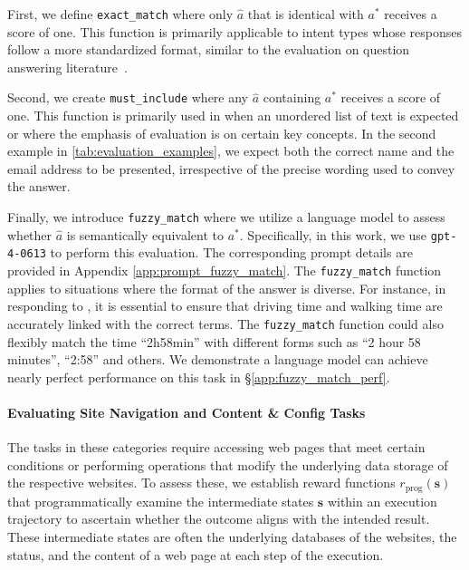 \documentclass{article}
\begin{document}
First, we define \texttt{exact\_match} where only $\hat{a}$ that is identical with $a^*$ receives a score of one. This function is primarily applicable to intent types whose responses follow a more standardized format, similar to the evaluation on question answering literature~\citep{rajpurkar2016squad,yang2018hotpotqa}. 

Second, we create \texttt{must\_include} where any $\hat{a}$ containing $a^*$ receives a score of one. This function is primarily used in %
when %
an unordered list of text is expected or where the emphasis of evaluation is on certain key concepts. In the second example in \autoref{tab:evaluation_examples}, we expect both the correct name and the email address to be presented, irrespective of the precise wording used to convey the answer.

Finally, we introduce \texttt{fuzzy\_match} where we utilize a language model to assess whether $\hat{a}$ is semantically equivalent to $a^*$. 
Specifically, in this work, we use \texttt{gpt-4-0613} to perform this evaluation.
The corresponding prompt details are provided in Appendix \ref{app:prompt_fuzzy_match}. 
The \texttt{fuzzy\_match} function applies to situations where the format of the answer is diverse. For instance, in responding to , it is essential to ensure that driving time and walking time are accurately linked with the correct terms. 
The \texttt{fuzzy\_match} function could also flexibly match the time ``2h58min'' with different forms such as ``2 hour 58 minutes'', ``2:58'' and others. 
We demonstrate a language model can achieve nearly perfect performance on this task in \S\ref{app:fuzzy_match_perf}.



\paragraph{Evaluating Site Navigation and Content \& Config Tasks} The tasks in these categories require accessing web pages that meet certain conditions or performing operations that modify the underlying data storage of the respective websites. 
To assess these, we establish reward functions $r_{\textrm{prog}}(\mathbf{s})$ that programmatically examine the intermediate states $\mathbf{s}$ within an execution trajectory to ascertain whether the outcome aligns with the intended result.
These intermediate states are often the underlying databases of the websites, the status, and the content of a web page at each step of the execution. 
\end{document}
